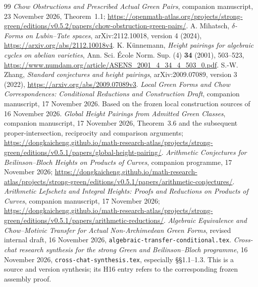 \documentclass[11pt]{article}
\theoremstyle{definition}
\numberwithin{equation}{section}
\begin{document}
\begin{thebibliography}{99}
 \emph{Chow Obstructions and Prescribed Actual Green Pairs}, companion manuscript, 23 November 2026, Theorem~1.1; \url{https://openmath-atlas.org/projects/strong-green/editions/v0.5.2/papers/chow-obstruction-green-pairs/}.
 A. Mihatsch, \emph{$\delta$-Forms on Lubin--Tate spaces}, arXiv:2112.10018, version 4 (2024), \url{https://arxiv.org/abs/2112.10018v4}.
 K. K\"unnemann, \emph{Height pairings for algebraic cycles on abelian varieties}, Ann. Sci. \'Ecole Norm. Sup. (4) \textbf{34} (2001), 503--523, \url{https://www.numdam.org/article/ASENS_2001_4_34_4_503_0.pdf}.
 S.-W. Zhang, \emph{Standard conjectures and height pairings}, arXiv:2009.07089, version 3 (2022), \url{https://arxiv.org/abs/2009.07089v3}.
 \emph{Local Green Forms and Chow Correspondences: Conditional Reductions and Construction Draft}, companion manuscript, 17 November 2026. Based on the frozen local construction sources of 16 November 2026.
 \emph{Global Height Pairings from Admitted Green Classes}, companion manuscript, 17 November 2026, Theorem~3.6 and the subsequent proper-intersection, reciprocity and comparison arguments; \url{https://dongkaicheng.github.io/math-research-atlas/projects/strong-green/editions/v0.5.1/papers/global-height-pairing/}.
 \emph{Arithmetic Conjectures for Beilinson--Bloch Heights on Products of Curves}, companion programme, 17 November 2026; \url{https://dongkaicheng.github.io/math-research-atlas/projects/strong-green/editions/v0.5.1/papers/arithmetic-conjectures/}.
 \emph{Arithmetic Lefschetz and Integral Heights: Proofs and Reductions on Products of Curves}, companion manuscript, 17 November 2026; \url{https://dongkaicheng.github.io/math-research-atlas/projects/strong-green/editions/v0.5.1/papers/arithmetic-reductions/}.
 \emph{Algebraic Equivalence and Chow--Motivic Transfer for Actual Non-Archimedean Green Forms}, revised internal draft, 16 November 2026, \texttt{algebraic-transfer-conditional.tex}.
 \emph{Cross-chat research synthesis for the strong Green and Beilinson--Bloch programme}, 16 November 2026, \texttt{cross-chat-synthesis.tex}, especially \S\S1.1--1.3. This is a source and version synthesis; its H16 entry refers to the corresponding frozen assembly proof.
\end{thebibliography}
\end{document}
